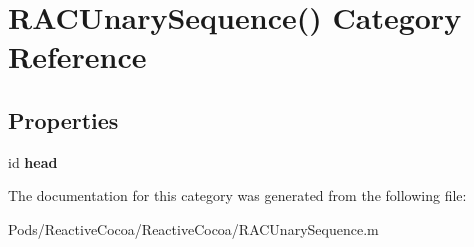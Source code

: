 \hypertarget{category_r_a_c_unary_sequence_07_08}{}\section{R\+A\+C\+Unary\+Sequence() Category Reference}
\label{category_r_a_c_unary_sequence_07_08}
\subsection*{Properties}
\begin{DoxyCompactItemize}
\item 
\mbox{\label{category_r_a_c_unary_sequence_07_08_aa642598fa175b85fb4b408d2887be44a}} 
id {\bfseries head}
\end{DoxyCompactItemize}


The documentation for this category was generated from the following file\+:\begin{DoxyCompactItemize}
\item 
Pods/\+Reactive\+Cocoa/\+Reactive\+Cocoa/R\+A\+C\+Unary\+Sequence.\+m\end{DoxyCompactItemize}

